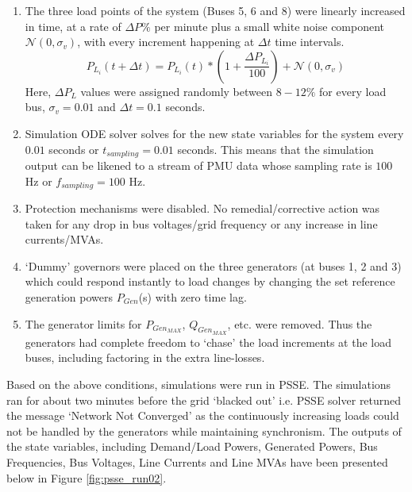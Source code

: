 \begin{enumerate}
	\item The three load points of the system (Buses 5, 6 and 8) were linearly increased in time, at a rate of $\Delta P \%$ per minute plus a small white noise component $\mathcal{N}(0, \sigma_v)$, with every increment happening at $\Delta t$ time intervals. 
	\begin{equation}
		P_{L_i}(t+\Delta t) = P_{L_i}(t)*\left(1+ \frac{\Delta P_{L_i}}{100}\right) + \mathcal{N}(0, \sigma_v)
	\end{equation} 
	Here, $\Delta P_{L}$ values were assigned randomly between $8-12\%$ for every load bus, $\sigma_v = 0.01$ and $\Delta t = 0.1$ seconds.
	\item Simulation ODE solver solves for the new state variables for the system every $0.01$ seconds or $t_{sampling}=0.01$ seconds. This means that the simulation output can be likened to a stream of PMU data whose sampling rate is $100$ Hz or $f_{sampling} = 100$ Hz.
	\item Protection mechanisms were disabled. No remedial/corrective action was taken for any drop in bus voltages/grid frequency or any increase in line currents/MVAs.
	\item `Dummy' governors were placed on the three generators (at buses 1, 2 and 3) which could respond instantly to load changes by changing the set reference generation powers $P_{Gen}$(s) with zero time lag.
	\item The generator limits for $P_{Gen_{MAX}}$, $Q_{Gen_{MAX}}$, etc. were removed. Thus the generators had complete freedom to `chase' the load increments at the load buses, including factoring in the extra line-losses.
\end{enumerate} 

Based on the above conditions, simulations were run in PSSE. The simulations ran for about two minutes before the grid `blacked out' i.e. PSSE solver returned the message `Network Not Converged' as the continuously increasing loads could not be handled by the generators while maintaining synchronism. The outputs of the state variables, including Demand/Load Powers, Generated Powers, Bus Frequencies, Bus Voltages, Line Currents and Line MVAs have been presented below in Figure \ref{fig:psse_run02}.

